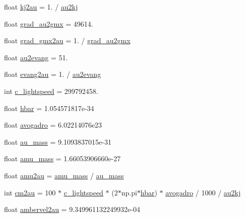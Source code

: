 \begin{DoxyCompactItemize}
\item 
float \hyperlink{namespacesrc_1_1nifty_aec1c7f8eea5eec6ad29796827312d19d}{kj2au} = 1. / \hyperlink{namespacesrc_1_1nifty_af5788f33a1e5a2d91f1dba0b7dc00f3e}{au2kj}
\item 
float \hyperlink{namespacesrc_1_1nifty_a829aae1bd9a882de17c5348ecbc4a5b4}{grad\+\_\+au2gmx} = 49614.
\item 
float \hyperlink{namespacesrc_1_1nifty_ab26986e6d355138d9adb83b402e7c48d}{grad\+\_\+gmx2au} = 1. / \hyperlink{namespacesrc_1_1nifty_a829aae1bd9a882de17c5348ecbc4a5b4}{grad\+\_\+au2gmx}
\item 
float \hyperlink{namespacesrc_1_1nifty_a2fa4528eeebf3c7353a157e6ac2a5256}{au2evang} = 51.
\item 
float \hyperlink{namespacesrc_1_1nifty_a6eaa0490a61cec15a40daef67e62ae95}{evang2au} = 1. / \hyperlink{namespacesrc_1_1nifty_a2fa4528eeebf3c7353a157e6ac2a5256}{au2evang}
\item 
int \hyperlink{namespacesrc_1_1nifty_a4acb2716dbb7ad1ccb96effa0328861c}{c\+\_\+lightspeed} = 299792458.
\item 
float \hyperlink{namespacesrc_1_1nifty_a3af7eb6b25ba3460807326b4a542c44a}{hbar} = 1.\+054571817e-\/34
\item 
float \hyperlink{namespacesrc_1_1nifty_aeed1993b103b65e612e37fcdf66792d5}{avogadro} = 6.\+02214076e23
\item 
float \hyperlink{namespacesrc_1_1nifty_aaa445cac2984fa47a49080735e5ceec7}{au\+\_\+mass} = 9.\+1093837015e-\/31
\item 
float \hyperlink{namespacesrc_1_1nifty_ae95fc9903e17d173018422e81b48d682}{amu\+\_\+mass} = 1.\+66053906660e-\/27
\item 
float \hyperlink{namespacesrc_1_1nifty_aa028dad85e8c12010da18e071e0f45dd}{amu2au} = \hyperlink{namespacesrc_1_1nifty_ae95fc9903e17d173018422e81b48d682}{amu\+\_\+mass} / \hyperlink{namespacesrc_1_1nifty_aaa445cac2984fa47a49080735e5ceec7}{au\+\_\+mass}
\item 
int \hyperlink{namespacesrc_1_1nifty_aefe681cba38c0f4df83e94f291942fec}{cm2au} = 100 $\ast$ \hyperlink{namespacesrc_1_1nifty_a4acb2716dbb7ad1ccb96effa0328861c}{c\+\_\+lightspeed} $\ast$ (2$\ast$np.\+pi$\ast$\hyperlink{namespacesrc_1_1nifty_a3af7eb6b25ba3460807326b4a542c44a}{hbar}) $\ast$ \hyperlink{namespacesrc_1_1nifty_aeed1993b103b65e612e37fcdf66792d5}{avogadro} / 1000 / \hyperlink{namespacesrc_1_1nifty_af5788f33a1e5a2d91f1dba0b7dc00f3e}{au2kj}
\item 
float \hyperlink{namespacesrc_1_1nifty_ad20028ef80e371a25d47a02a01ac5f90}{ambervel2au} = 9.\+349961132249932e-\/04

\end{DoxyCompactItemize}
